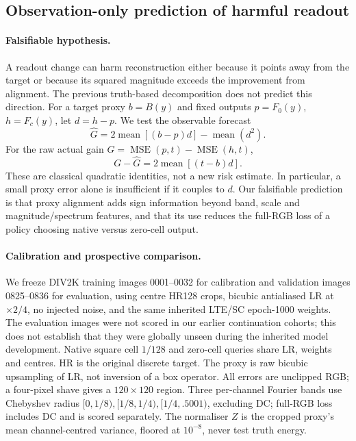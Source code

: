 \subsection{Observation-only prediction of harmful readout}\label{app:negative-readout}
\paragraph{Falsifiable hypothesis.}
A readout change can harm reconstruction either because it points away from the target or because its squared magnitude exceeds the improvement from alignment. The previous truth-based decomposition does not predict this direction. For a target proxy $b=B(y)$ and fixed outputs $p=F_0(y)$, $h=F_c(y)$, let $d=h-p$. We test the observable forecast
\[
 \widehat G=2\operatorname{mean}[(b-p)d]-\operatorname{mean}(d^2).
\]
For the raw actual gain $G=\operatorname{MSE}(p,t)-\operatorname{MSE}(h,t)$,
\[
 G-\widehat G=2\operatorname{mean}[(t-b)d].
\]
These are classical quadratic identities, not a new risk estimate. In particular, a small proxy error alone is insufficient if it couples to $d$. Our falsifiable prediction is that proxy alignment adds sign information beyond band, scale and magnitude/spectrum features, and that its use reduces the full-RGB loss of a policy choosing native versus zero-cell output.

\paragraph{Calibration and prospective comparison.}
We freeze DIV2K training images 0001--0032 for calibration and validation images 0825--0836 for evaluation, using centre HR128 crops, bicubic antialiased LR at $\times2/4$, no injected noise, and the same inherited LTE/SC epoch-1000 weights. The evaluation images were not scored in our earlier continuation cohorts; this does not establish that they were globally unseen during the inherited model development. Native square cell $1/128$ and zero-cell queries share LR, weights and centres. HR is the original discrete target. The proxy is raw bicubic upsampling of LR, not inversion of a box operator. All errors are unclipped RGB; a four-pixel shave gives a $120\times120$ region. Three per-channel Fourier bands use Chebyshev radius $[0,1/8),[1/8,1/4),[1/4,.5001)$, excluding DC; full-RGB loss includes DC and is scored separately. The normaliser $Z$ is the cropped proxy's mean channel-centred variance, floored at $10^{-8}$, never test truth energy.

